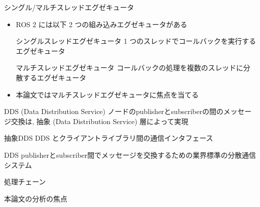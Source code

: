 \begin{frame}{シングル/マルチスレッドエグゼキュータ}
    \begin{itemize}
        \item ROS 2 には以下 2 つの組み込みエグゼキュータがある
              \begin{block}{シングルスレッドエグゼキュータ}
                  1 つのスレッドでコールバックを実行するエグゼキュータ
              \end{block}
              \begin{block}{マルチスレッドエグゼキュータ}
                  コールバックの処理を複数のスレッドに分散するエグゼキュータ
              \end{block}
              \vspace{5mm}

        \item 本論文ではマルチスレッドエグゼキュータに焦点を当てる
    \end{itemize}
\end{frame}

\begin{frame}{DDS (Data Distribution Service)}
    ノードのpublisherとsubscriberの間のメッセージ交換は, 抽象 (Data Distribution Service) 層によって実現

    \begin{block}{抽象DDS}
        DDS とクライアントライブラリ間の通信インタフェース
    \end{block}
    \begin{block}{DDS}
        publisherとsubscriber間でメッセージを交換するための業界標準の分散通信システム
    \end{block}
\end{frame}

\begin{frame}{処理チェーン}
\end{frame}

\begin{frame}{本論文の分析の焦点}
\end{frame}

